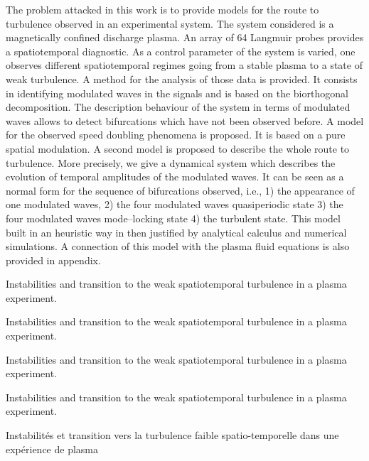 The problem attacked in this work is to provide models for the route
to turbulence 
observed in an experimental system. The system considered is a
magnetically confined discharge plasma. An array of 64 Langmuir probes
provides a spatiotemporal diagnostic. As a control parameter of the
system is varied, one observes different spatiotemporal regimes going
from a stable plasma to a state of weak turbulence.
A method for the analysis of those data is provided. It consists in
identifying modulated waves in the signals and is based on the
biorthogonal decomposition.
The description behaviour of the system in terms of modulated waves
allows to 
detect bifurcations which have not been observed before.
A model for the observed speed doubling phenomena is proposed. It is
based on a pure spatial modulation.
A second model is proposed to describe the whole
route to turbulence. 
More precisely, we give a dynamical system which describes the evolution
of temporal amplitudes of 
the modulated waves. It can be seen as a normal form for the sequence
of bifurcations observed, i.e., 1) the appearance of one modulated waves,
2) the four modulated waves quasiperiodic state 3) the four modulated
waves mode--locking  state 4) the turbulent state.
This model built in an heuristic way in then justified by analytical
calculus and numerical simulations. A connection of this model with
the plasma fluid equations is also provided in appendix.



Instabilities and transition to the weak spatiotemporal turbulence in
a plasma experiment.

Instabilities and transition to the weak spatiotemporal turbulence in
a plasma experiment.

Instabilities and transition to the weak spatiotemporal turbulence in
a plasma experiment.

Instabilities and transition to the weak spatiotemporal turbulence in
a plasma experiment.









Instabilit\'es et transition vers la turbulence
faible spatio-temporelle dans une exp\'erience de plasma

\vspace{10mm}
